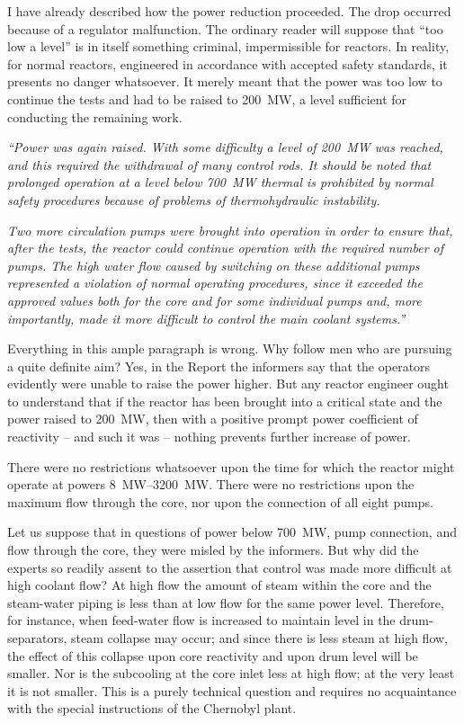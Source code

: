 \documentclass[openright]{bookest}
\begin{document}
I have already described how the power reduction proceeded. The drop occurred because of a regulator malfunction. The ordinary reader will suppose that ``too low a level'' is in itself something criminal, impermissible for reactors. In reality, for normal reactors, engineered in accordance with accepted safety standards, it presents no danger whatsoever. It merely meant that the power was too low to continue the tests and had to be raised to \qty{200}{\mega\watt}, a level sufficient for conducting the remaining work.

\begin{personal}
\textit{``Power was again raised. With some difficulty a level of \qty{200}{\mega\watt} was reached, and this required the withdrawal of many control rods. It should be noted that prolonged operation at a level below \qty{700}{\mega\watt} thermal is prohibited by normal safety procedures because of problems of thermohydraulic instability.}

\textit{Two more circulation pumps were brought into operation in order to ensure that, after the tests, the reactor could continue operation with the required number of pumps. The high water flow caused by switching on these additional pumps represented a violation of normal operating procedures, since it exceeded the approved values both for the core and for some individual pumps and, more importantly, made it more difficult to control the main coolant systems.''}
\end{personal}

Everything in this ample paragraph is wrong. Why follow men who are pursuing a quite definite aim? Yes, in the Report the informers say that the operators evidently were unable to raise the power higher. But any reactor engineer ought to understand that if the reactor has been brought into a critical state and the power raised to \qty{200}{\mega\watt}, then with a positive prompt power coefficient of reactivity -- and such it was -- nothing prevents further increase of power.

There were no restrictions whatsoever upon the time for which the reactor might operate at powers \qtyrange[range-open-phrase={\text{from} }]{8}{3200}{\mega\watt}. There were no restrictions upon the maximum flow through the core, nor upon the connection of all eight pumps.

Let us suppose that in questions of power below \qty{700}{\mega\watt}, pump connection, and flow through the core, they were misled by the informers. But why did the experts so readily assent to the assertion that control was made more difficult at high coolant flow? At high flow the amount of steam within the core and the steam-water piping is less than at low flow for the same power level. Therefore, for instance, when feed-water flow is increased to maintain level in the drum-separators, steam collapse may occur; and since there is less steam at high flow, the effect of this collapse upon core reactivity and upon drum level will be smaller. Nor is the subcooling at the core inlet less at high flow; at the very least it is not smaller. This is a purely technical question and requires no acquaintance with the special instructions of the Chernobyl plant.
\end{document}
